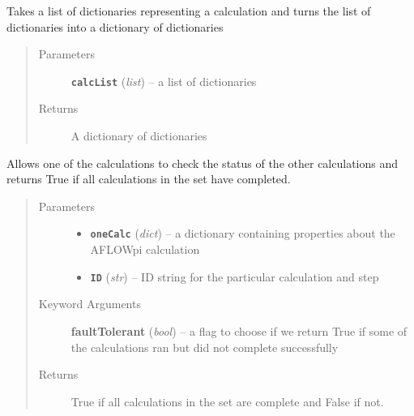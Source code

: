 \documentclass[letterpaper,10pt,english]{sphinxmanual}
\begin{document}

\begin{fulllineitems}
\label{prep:prep.__calcsFromCalcList}
Takes a list of dictionaries representing a calculation and turns the
list of dictionaries into a dictionary of dictionaries
\begin{quote}\begin{description}
\item[{Parameters}] \leavevmode
\textbf{\texttt{calcList}} (\emph{list}) -- a list of dictionaries

\item[{Returns}] \leavevmode
A dictionary of dictionaries

\end{description}\end{quote}

\end{fulllineitems}


\begin{fulllineitems}
\label{prep:prep.__checkSuccessCompletion}
Allows one of the calculations to check the status of the other calculations
and returns True if all calculations in the set have completed.
\begin{quote}\begin{description}
\item[{Parameters}] \leavevmode\begin{itemize}
\item {} 
\textbf{\texttt{oneCalc}} (\emph{dict}) -- a dictionary containing properties about the AFLOWpi calculation

\item {} 
\textbf{\texttt{ID}} (\emph{str}) -- ID string for the particular calculation and step

\end{itemize}

\item[{Keyword Arguments}] \leavevmode
\textbf{faultTolerant} (\emph{bool}) --
a flag to choose if we return True if some of the
calculations ran but did not complete successfully

\item[{Returns}] \leavevmode
True if all calculations in the set are complete and False if not.

\end{description}\end{quote}

\end{fulllineitems}
\end{document}
